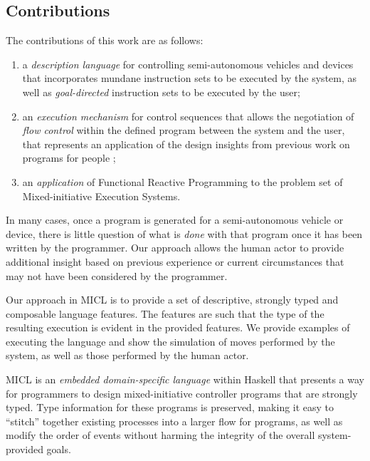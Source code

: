 \documentclass{sig-alternate-05-2015}
\begin{document}
\subsection{Contributions}
\label{sec:intro:contr}
The contributions of this work are as follows:

\begin{enumerate}[label=C\arabic*.,ref=C\arabic*,leftmargin=*]
\item a \emph{description language} for controlling semi-autonomous
  vehicles and devices that incorporates mundane instruction sets to be
  executed by the system, as well as \emph{goal-directed} instruction sets to
  be executed by the user;
\item an \emph{execution mechanism} for control sequences that allows the
  negotiation of \emph{flow control} within the defined program between the
  system and the user, that represents an application of the design insights
  from previous work on programs for people \cite{abbott2015prog};
\item an \emph{application} of Functional Reactive Programming to the problem
  set of Mixed-initiative Execution Systems.
\end{enumerate}

In many cases, once a program is generated for a semi-autonomous vehicle or
device, there is little question of what is \emph{done} with that program once
it has been written by the programmer. Our approach allows the human actor to
provide additional insight based on previous experience or current
circumstances that may not have been considered by the programmer.

Our approach in MICL is to provide a set of descriptive, strongly typed and
composable language features. The features are such that the type of the
resulting execution is evident in the provided features. We provide examples
of executing the language and show the simulation of moves performed by the
system, as well as those performed by the human actor.

MICL is an \emph{embedded domain-specific language} within Haskell that
presents a way for programmers to design mixed-initiative controller programs
that are strongly typed. Type information for these programs is preserved,
making it easy to ``stitch'' together existing processes into a larger flow
for programs, as well as modify the order of events without harming the
integrity of the overall system-provided goals.
\end{document}
